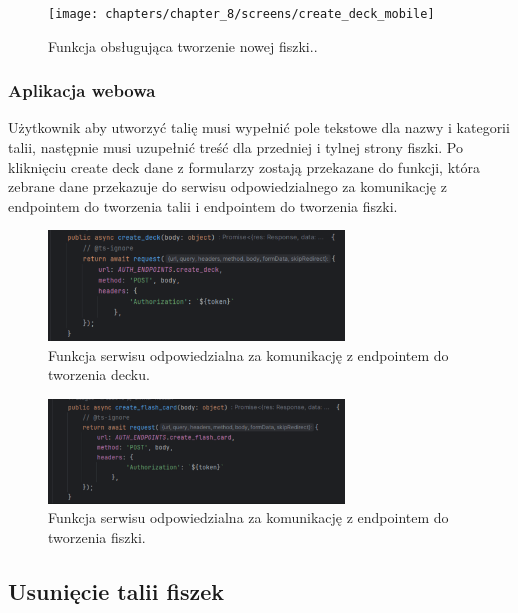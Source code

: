 \begin{figure}[H]
    \centering
    \texttt{[image: chapters/chapter\_8/screens/create\_deck\_mobile]}
    \caption{Funkcja obsługująca tworzenie nowej fiszki..}
    \label{img:create_deck_mobile}
\end{figure}

\subsubsection{Aplikacja webowa}

Użytkownik aby utworzyć talię musi wypełnić pole tekstowe dla nazwy i kategorii talii, następnie musi uzupełnić treść dla przedniej i tylnej strony fiszki. Po kliknięciu create deck dane z formularzy zostają przekazane do funkcji, która zebrane dane przekazuje do serwisu odpowiedzialnego za komunikację z endpointem do tworzenia talii i endpointem do tworzenia fiszki.

\begin{figure}[H]
    \centering
    \includegraphics[width=0.7\textwidth]{chapters/chapter_8/screens/create_deck_web}
    \caption{Funkcja serwisu odpowiedzialna za komunikację z endpointem do tworzenia decku.}
    \label{img:create_deck_web}
\end{figure}

\begin{figure}[H]
    \centering
    \includegraphics[width=0.7\textwidth]{chapters/chapter_8/screens/create_flash_card_web}
    \caption{Funkcja serwisu odpowiedzialna za komunikację z endpointem do tworzenia fiszki.}
    \label{img:create_flash_card_web}
\end{figure}

\subsection{Usunięcie talii fiszek}

